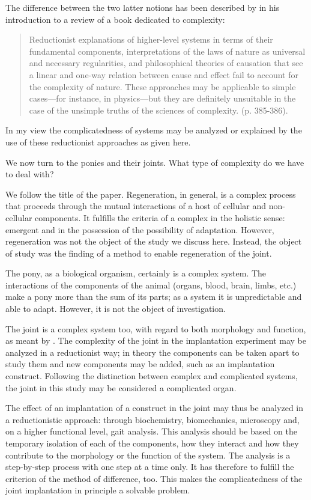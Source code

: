 \documentclass[twocolumn, reflection, authordate, serif, seplic]{jote-article}
\begin{document}
The difference between the two latter notions has been described by \textcite{Radder2011} in his introduction to a review of a book dedicated to complexity:

\begin{quote}
Reductionist explanations of higher-level systems in terms of their fundamental components, interpretations of the laws of nature as universal and necessary regularities, and philosophical theories of causation that see a linear and one-way relation between cause and effect fail to account for the complexity of nature. These approaches may be applicable to simple cases---for instance, in physics---but they are definitely unsuitable in the case of the unsimple truths of the sciences of complexity. (p. 385-386). \end{quote}

In my view the complicatedness of systems may be analyzed or explained by the use of these reductionist approaches as given here.

We now turn to the ponies and their joints. What type of complexity do we have to deal with?

We follow the title of the paper. Regeneration, in general, is a complex process that proceeds through the mutual interactions of a host of cellular and non-cellular components. It fulfills the criteria of a complex in the holistic sense: emergent and in the possession of the possibility of adaptation. However, regeneration was not the object of the study we discuss here. Instead, the object of study was the finding of a method to enable regeneration of the joint.

The pony, as a biological organism, certainly is a complex system. The interactions of the components of the animal (organs, blood, brain, limbs, etc.) make a pony more than the sum of its parts; as a system it is unpredictable and able to adapt. However, it is not the object of investigation.

The joint is a complex system too, with regard to both morphology and function, as meant by \textcite{McShea1996}. The complexity of the joint in the implantation experiment may be analyzed in a reductionist way; in theory the components can be taken apart to study them and new components may be added, such as an implantation construct. Following the distinction between complex and complicated systems, the joint in this study may be considered a complicated organ.

The effect of an implantation of a construct in the joint may thus be analyzed in a reductionistic approach: through biochemistry, biomechanics, microscopy and, on a higher functional level, gait analysis. This analysis should be based on the temporary isolation of each of the components, how they interact and how they contribute to the morphology or the function of the system. The analysis is a step-by-step process with one step at a time only. It has therefore to fulfill the criterion of the method of difference, too. This makes the complicatedness of the joint implantation in principle a solvable problem.
\end{document}
